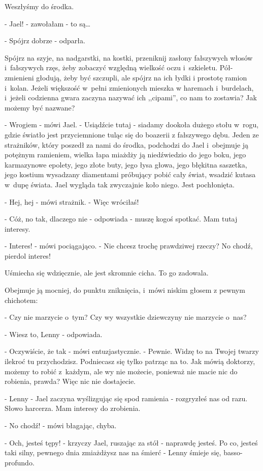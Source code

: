 \documentclass[oneside,polish,12pt,sfheadings]{mwbk}
\begin{document}
Weszłyśmy do środka. 

- Jael! - zawołałam - to są\ldots

- Spójrz dobrze - odparła.

Spójrz na szyje, na nadgarstki, na kostki, przeniknij zasłony fałszywych
włosów i~fałszywych rzęs, żeby zobaczyć względną wielkość oczu i~szkieletu.
Pół-zmienieni głodują, żeby być szczupli, ale spójrz na ich łydki
i prostotę ramion i~kolan. Jeżeli większość w~pełni zmienionych mieszka
w haremach i~burdelach, i~jeżeli codzienna gwara zaczyna nazywać ich
,,cipami'', co nam to zostawia? Jak możemy być nazwane?

- Wrogiem - mówi Jael. - Usiądźcie tutaj - siadamy dookoła dużego
stołu w~rogu, gdzie światło jest przyciemnione tuląc się do boazerii
z fałszywego dębu. Jeden ze strażników, który poszedł za nami do środka,
podchodzi do Jael i~obejmuje ją potężnym ramieniem, wielka łapa miażdży
ją niedźwiedzio do jego boku, jego karmazynowe epolety, jego złote
buty, jego łysa głowa, jego błękitna saszetka, jego kostium wysadzany
diamentami próbujący pobić cały świat, wsadzić kutasa w~dupę świata.
Jael wygląda tak zwyczajnie koło niego. Jest pochłonięta.

- Hej, hej - mówi strażnik. - Więc wróciłaś!

- Cóż, no tak, dlaczego nie - odpowiada - muszę kogoś spotkać. Mam
tutaj interesy.

- Interes! - mówi pociągająco. - Nie chcesz trochę prawdziwej rzeczy?
No chodź, pierdol interes!

Uśmiecha się wdzięcznie, ale jest skromnie cicha. To go zadowala.

Obejmuje ją mocniej, do punktu zniknięcia, i~mówi niskim głosem z
pewnym chichotem: 

- Czy nie marzycie o~tym? Czy wy wszystkie dziewczyny
nie marzycie o~nas?

- Wiesz to, Lenny - odpowiada.

- Oczywiście, że tak - mówi entuzjastycznie. - Pewnie. Widzę to na
Twojej twarzy ilekroć tu przychodzisz. Podniecasz się tylko patrząc
na to. Jak mówią doktorzy, możemy to robić z~każdym, ale wy nie możecie,
ponieważ nie macie nic do robienia, prawda? Więc nic nie dostajecie.

- Lenny - Jael zaczyna wyślizgując się spod ramienia - rozgryzłeś
nas od razu. Słowo harcerza. Mam interesy do zrobienia.

- No chodź! - mówi błagając, chyba.

- Och, jesteś tępy! - krzyczy Jael, ruszając za stół - naprawdę jesteś.
Po co, jesteś taki silny, pewnego dnia zmiażdżysz nas na śmierć -
Lenny śmieje się, basso-profundo. 
\end{document}
